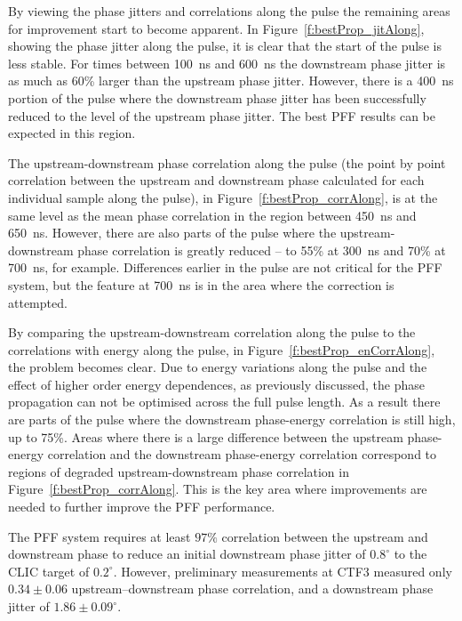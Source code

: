 By viewing the phase jitters and correlations along the pulse the remaining areas for improvement start to become apparent. In Figure~\ref{f:bestProp_jitAlong}, showing the phase jitter along the pulse, it is clear that the start of the pulse is less stable. For times between 100~ns and 600~ns the downstream phase jitter is as much as 60\% larger than the upstream phase jitter.  However, there is a 400~ns portion of the pulse where the downstream phase jitter has been successfully reduced to the level of the upstream phase jitter. The best PFF results can be expected in this region.

The upstream-downstream phase correlation along the pulse (the point by point correlation between the upstream and downstream phase calculated for each individual sample along the pulse), in Figure~\ref{f:bestProp_corrAlong}, is at the same level as the mean phase correlation in the region between 450~ns and 650~ns. However, there are also parts of the pulse where the upstream-downstream phase correlation is greatly reduced -- to 55\% at 300~ns and 70\% at 700~ns, for example. Differences earlier in the pulse are not critical for the PFF system, but the feature at 700~ns is in the area where the correction is attempted.

By comparing the upstream-downstream correlation along the pulse to the correlations with energy along the pulse, in Figure~\ref{f:bestProp_enCorrAlong}, the problem becomes clear. Due to energy variations along the pulse and the effect of higher order energy dependences, as previously discussed, the phase propagation can not be optimised across the full pulse length. As a result there are parts of the pulse where the downstream phase-energy correlation is still high, up to 75\%. Areas where there is a large difference between the upstream phase-energy correlation and the downstream phase-energy correlation correspond to regions of degraded upstream-downstream phase correlation in Figure~\ref{f:bestProp_corrAlong}. This is the key area where improvements are needed to further improve the PFF performance.




The PFF system requires at least \(97\%\) correlation between the upstream and downstream phase to reduce an initial downstream phase jitter of \(0.8^\circ\) to the CLIC target of \(0.2^\circ\). However, preliminary measurements at CTF3 measured only \(0.34\pm0.06\) upstream--downstream phase correlation, and a downstream phase jitter of \(1.86\pm0.09^\circ\).

